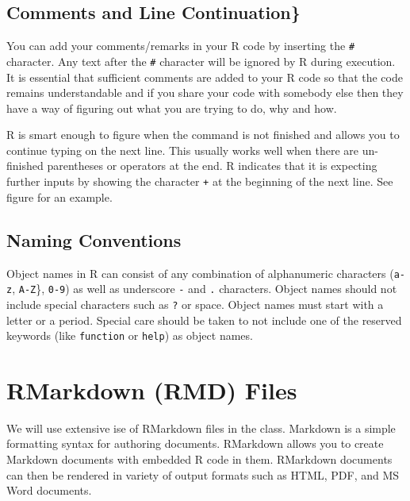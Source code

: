 \documentclass[]{krantz}
\makeatletter
\newenvironment{Shaded}{\begin{snugshade}}{\end{snugshade}}
\newcommand{\CommentTok}[1]{\textcolor[rgb]{0.56,0.35,0.01}{\textit{#1}}}
\newenvironment{kframe}{%
\medskip{}
\setlength{\fboxsep}{.8em}
 \def\at@end@of@kframe{}%
 \ifinner\ifhmode%
  \def\at@end@of@kframe{\end{minipage}}%
  \begin{minipage}{\columnwidth}%
 \fi\fi%
 \def\FrameCommand##1{\hskip\@totalleftmargin \hskip-\fboxsep
 \colorbox{shadecolor}{##1}\hskip-\fboxsep
     \hskip-\linewidth \hskip-\@totalleftmargin \hskip\columnwidth}%
 \MakeFramed {\advance\hsize-\width
   \@totalleftmargin\z@ \linewidth\hsize
   \@setminipage}}%
 {\par\unskip\endMakeFramed%
 \at@end@of@kframe}
\renewenvironment{Shaded}{\begin{kframe}}{\end{kframe}}
\theoremstyle{definition}
\theoremstyle{definition}
\theoremstyle{definition}
\theoremstyle{remark}
\makeatother
\begin{document}
\subsection{\texorpdfstring{Comments and Line Continuation\}\\
}{Comments and Line Continuation\} }}\label{comments-and-line-continuation}

You can add your comments/remarks in your R code by inserting the
\texttt{\#} character. Any text after the \texttt{\#} character will be
ignored by R during execution. It is essential that sufficient comments
are added to your R code so that the code remains understandable and if
you share your code with somebody else then they have a way of figuring
out what you are trying to do, why and how.

R is smart enough to figure when the command is not finished and allows
you to continue typing on the next line. This usually works well when
there are un-finished parentheses or operators at the end. R indicates
that it is expecting further inputs by showing the character \texttt{+}
at the beginning of the next line. See figure for an example.

\begin{Shaded}
\begin{Highlighting}[]
\CommentTok{# %
\end{Highlighting}
\end{Shaded}

\subsection{Naming Conventions}\label{naming-conventions}

Object names in R can consist of any combination of alphanumeric
characters (\texttt{a-z}, \texttt{A-Z}\}, \texttt{0-9}) as well as
underscore \texttt{-} and \texttt{.} characters. Object names should not
include special characters such as \texttt{?} or space. Object names
must start with a letter or a period. Special care should be taken to
not include one of the reserved keywords (like \texttt{function} or
\texttt{help}) as object names.

\section{RMarkdown (RMD) Files}\label{rmarkdown-rmd-files}

We will use extensive ise of RMarkdown files in the class. Markdown is a
simple formatting syntax for authoring documents. RMarkdown allows you
to create Markdown documents with embedded R code in them. RMarkdown
documents can then be rendered in variety of output formats such as
HTML, PDF, and MS Word documents.
\end{document}
